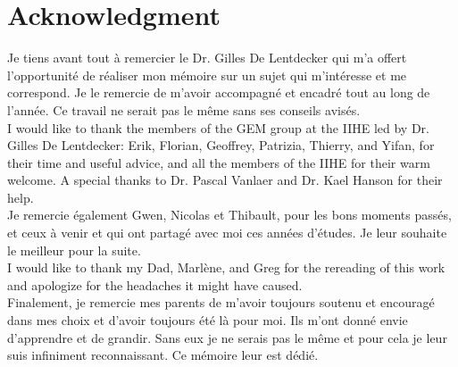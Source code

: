 \chapter*{Acknowledgment}
\label{chap:acknowledgment}

	Je tiens avant tout à remercier le Dr. Gilles De Lentdecker qui m'a offert l'opportunité de réaliser mon mémoire sur un sujet qui m'intéresse et me correspond. Je le remercie de m'avoir accompagné et encadré tout au long de l'année. Ce travail ne serait pas le même sans ses conseils avisés. \\
	 
	I would like to thank the members of the GEM group at the IIHE led by Dr. Gilles De Lentdecker: Erik, Florian, Geoffrey, Patrizia, Thierry, and Yifan, for their time and useful advice, and all the members of the IIHE for their warm welcome. A special thanks to Dr. Pascal Vanlaer and Dr. Kael Hanson for their help. \\
	 
	Je remercie également Gwen, Nicolas et Thibault, pour les bons moments passés, et ceux à venir et qui ont partagé avec moi ces années d’études. Je leur souhaite le meilleur pour la suite. \\
	 
	I would like to thank my Dad, Marlène, and Greg for the rereading of this work and apologize for the headaches it might have caused. \\
	
	Finalement, je remercie mes parents de m’avoir toujours soutenu et encouragé dans mes choix et d'avoir toujours été là pour moi. Ils m'ont donné envie d'apprendre et de grandir. Sans eux je ne serais pas le même et pour cela je leur suis infiniment reconnaissant. Ce mémoire leur est dédié.  